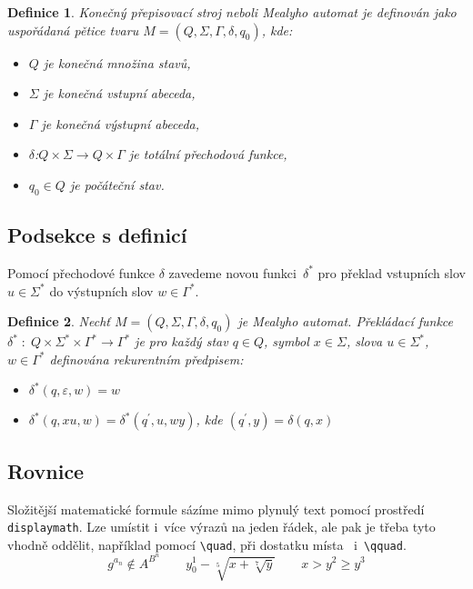 \documentclass[twocolumn, a4paper, 11pt]{article}
\newtheorem{definition}{Definice}
\begin{document}
\begin{definition}
\label{def:MealyhoAutomat}
\emph{Konečný přepisovací stroj} neboli \emph{Mealyho automat} je definován jako uspořádaná pětice tvaru $M = (Q, \Sigma, \Gamma, \delta, q_0)$, kde:
        \begin{itemize}

		\item $Q$ je konečná množina \emph{stavů},

		\item $\Sigma$ je konečná \emph{vstupní abeceda},

		\item $\Gamma$ je konečná \emph{výstupní abeceda},

		\item $\delta$\;:\;$Q \times \Sigma \rightarrow Q \times \Gamma$ je totální \emph{přechodová funkce},

		\item $q_0 \in Q$ je \emph{počáteční stav}.

	\end{itemize}
\end{definition}
 \subsection{Podsekce s definicí}
Pomocí přechodové funkce $\delta$ zavedeme novou funkci~$\delta^{*}$ pro překlad vstupních slov $u \in \Sigma^{*}$ do výstupních slov $w \in \Gamma^{*}$.
 \begin{definition}
 Nechť $M = (Q, \Sigma, \Gamma, \delta, q_{0})$ je Mealyho automat. \emph{Překládací funkce} $\delta^{*}\;:\; Q \times \Sigma^{*} \times \Gamma^{*} \rightarrow \Gamma^{*}$ je pro každý stav $q \in Q$, symbol $x \in \Sigma$, slova $u \in \Sigma^{*}$, $w \in \Gamma^{*}$ definována rekurentním předpisem:  
 \begin{itemize}
     \item $\delta^{*}(q,\varepsilon,w)= w$
     \item $\delta^{*}(q,xu,w)= \delta^{*}(q^{\prime},u,wy)$, kde $(q^{\prime},y)=\delta(q,x)$
 \end{itemize}
 \end{definition}
 
\subsection{Rovnice}
Složitější matematické formule sázíme mimo plynulý text pomocí prostředí \texttt{displaymath}. Lze umístit i~více výrazů na jeden řádek, ale pak je třeba tyto vhodně oddělit, například pomocí \verb|\quad|, při dostatku místa \ i~\verb|\qquad|.
$$g^{a_n} \notin A^{B^n} \qquad y_{0}^{1} - \sqrt[5]{x+\sqrt[7]{y}} \qquad x>y^{2} \geq y^3$$
\end{document}
